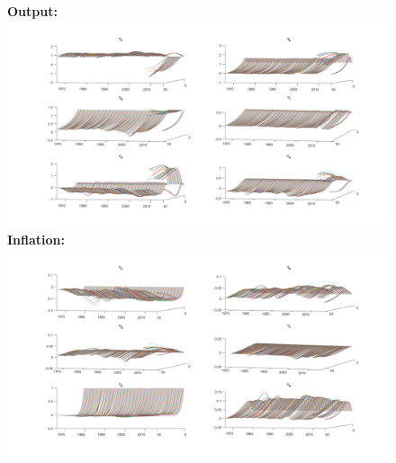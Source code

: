 \documentclass[12pt,reqno]{article}
\numberwithin{equation}{section}
\begin{document}
\begin{figure}[H]
\textbf{Output:}\\
\includegraphics[scale=0.5]{AR1_impresp_output_3d.pdf}
\textbf{Inflation:}\\
\includegraphics[scale=0.5]{AR1_impresp_pinf_3d.pdf}

\end{figure}
\end{document}
